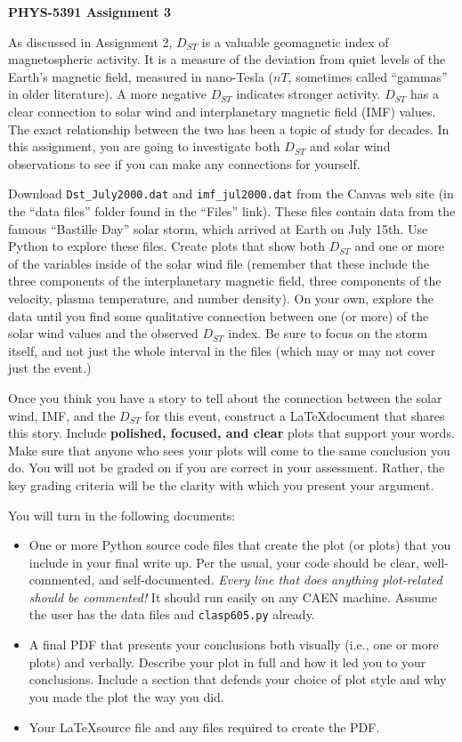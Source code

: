 \documentclass[12pt, letterpaper]{article}
\begin{document}
\begin{center}
  {\LARGE \textbf{PHYS-5391 Assignment 3}}\\
\end{center}

As discussed in Assignment 2, $D_{ST}$ is a valuable geomagnetic index of 
magnetospheric activity.  It is a measure of the deviation from quiet levels
of the Earth's magnetic field, measured in nano-Tesla ($nT$, sometimes called
``gammas'' in older literature).  A more negative $D_{ST}$ indicates stronger
activity.  $D_{ST}$ has a clear connection to solar wind
and interplanetary magnetic field (IMF) values.
The exact relationship between the two
has been a topic of study for decades.  In this assignment, you are going to
investigate both $D_{ST}$ and solar wind observations to see if you can make
any connections for yourself.

Download {\tt Dst\_July2000.dat} and {\tt imf\_jul2000.dat} from the Canvas
web site (in the ``data files'' folder found in the ``Files'' link).  These
files contain data from the famous ``Bastille Day'' solar storm, which arrived
at Earth on July 15th.  Use
Python to explore these files.  Create plots that show both $D_{ST}$ and one
or more of the variables inside of the solar wind file (remember that these
include the three components of the interplanetary magnetic field, three
components of the velocity, plasma temperature, and number density).
On your own,
explore the data until you find some qualitative connection between one (or
more) of the solar wind values and the observed $D_{ST}$ index.  Be sure to
focus on the storm itself, and not just the whole interval in the files (which
may or may not cover just the event.)

Once you think you have a story to tell about the connection between the
solar wind, IMF, and the $D_{ST}$ for this event, construct a \LaTeX document
that shares this story.  Include \textbf{polished, focused, and clear} plots
that support your words.  Make sure that anyone who sees your plots will
come to the same conclusion you do.  You will not be graded on if you are
correct in your assessment.  Rather, the key grading criteria will be the
clarity with which you present your argument.

You will turn in the following documents:
\begin{itemize}
\item One or more Python source code files that create the plot (or plots)
  that you include in your final write up.  Per the usual, your code should
  be clear, well-commented, and self-documented.  \emph{Every line that does
    anything plot-related should be commented!}  It should run easily on
  any CAEN machine.  Assume the user has the data files and {\tt clasp605.py}
  already.
\item A final PDF that presents your conclusions both visually (i.e., one or
  more plots) and verbally.  Describe your plot in full and how it led you
  to your conclusions.  Include a section that defends your choice of plot
  style and why you made the plot the way you did.
\item Your \LaTeX source file and any files required to create the PDF.
\end{itemize}
\end{document}
